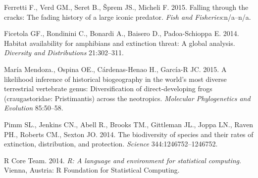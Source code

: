 \documentclass[author-year, review, 11pt]{components/elsarticle} %
\begin{document}
Ferretti F., Verd GM., Seret B., {Š}prem JS., Micheli F. 2015. Falling
through the cracks: The fading history of a large iconic predator.
\emph{Fish and Fisheries}:n/a--n/a.

Ficetola GF., Rondinini C., Bonardi A., Baisero D., Padoa-Schioppa E.
2014. Habitat availability for amphibians and extinction threat: A
global analysis. \emph{Diversity and Distributions} 21:302--311.

Mar{í}a Mendoza., Ospina OE., C{á}rdenas-Henao H., Garc{í}a-R JC. 2015.
A likelihood inference of historical biogeography in the world's most
diverse terrestrial vertebrate genus: Diversification of
direct-developing frogs (craugastoridae: Pristimantis) across the
neotropics. \emph{Molecular Phylogenetics and Evolution} 85:50--58.

Pimm SL., Jenkins CN., Abell R., Brooks TM., Gittleman JL., Joppa LN.,
Raven PH., Roberts CM., Sexton JO. 2014. The biodiversity of species and
their rates of extinction, distribution, and protection. \emph{Science}
344:1246752--1246752.

R Core Team. 2014. \emph{R: A language and environment for statistical
computing}. Vienna, Austria: R Foundation for Statistical Computing.
\end{document}
